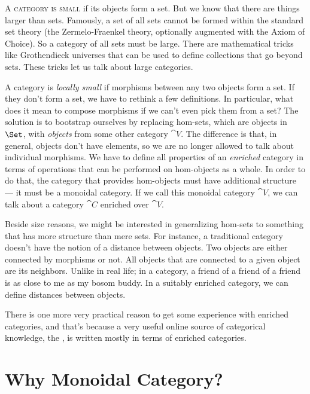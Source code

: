 
\lettrine[lhang=0.17]{A}{ category is small} if its objects form a set. But we know that
there are things larger than sets. Famously, a set of all sets cannot be
formed within the standard set theory (the Zermelo-Fraenkel theory,
optionally augmented with the Axiom of Choice). So a category of all
sets must be large. There are mathematical tricks like Grothendieck
universes that can be used to define collections that go beyond sets.
These tricks let us talk about large categories.

A category is \emph{locally small} if morphisms between any two objects
form a set. If they don't form a set, we have to rethink a few
definitions. In particular, what does it mean to compose morphisms if we
can't even pick them from a set? The solution is to bootstrap ourselves
by replacing hom-sets, which are objects in $\Set$, with
\emph{objects} from some other category $\cat{V}$. The difference is
that, in general, objects don't have elements, so we are no longer
allowed to talk about individual morphisms. We have to define all
properties of an \emph{enriched} category in terms of operations that
can be performed on hom-objects as a whole. In order to do that, the
category that provides hom-objects must have additional structure --- it
must be a monoidal category. If we call this monoidal category $\cat{V}$,
we can talk about a category $\cat{C}$ enriched over $\cat{V}$.

Beside size reasons, we might be interested in generalizing hom-sets to
something that has more structure than mere sets. For instance, a
traditional category doesn't have the notion of a distance between
objects. Two objects are either connected by morphisms or not. All
objects that are connected to a given object are its neighbors. Unlike
in real life; in a category, a friend of a friend of a friend is as
close to me as my bosom buddy. In a suitably enriched category, we can
define distances between objects.

There is one more very practical reason to get some experience with
enriched categories, and that's because a very useful online source of
categorical knowledge, the , is written
mostly in terms of enriched categories.

\section{Why Monoidal Category?}

